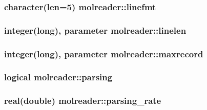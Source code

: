 \hypertarget{classmolreader_ac14650c697f68fd15530b93807e3f42f}{
\subsubsection[{linefmt}]{\setlength{\rightskip}{0pt plus 5cm}character(len=5) molreader\-::linefmt\hspace{0.3cm}{\ttfamily [private]}}}\label{classmolreader_ac14650c697f68fd15530b93807e3f42f}
\hypertarget{classmolreader_acd493d996a1fcd0ed77937e925c9b7fe}{
\subsubsection[{linelen}]{\setlength{\rightskip}{0pt plus 5cm}integer(long), parameter molreader\-::linelen\hspace{0.3cm}{\ttfamily [private]}}}\label{classmolreader_acd493d996a1fcd0ed77937e925c9b7fe}
\hypertarget{classmolreader_a7192fdfba4bcb0ee7504a9c6695c7106}{
\subsubsection[{maxrecord}]{\setlength{\rightskip}{0pt plus 5cm}integer(long), parameter molreader\-::maxrecord\hspace{0.3cm}{\ttfamily [private]}}}\label{classmolreader_a7192fdfba4bcb0ee7504a9c6695c7106}
\hypertarget{classmolreader_a151a8b8c33b86ab86d352aeaaf9ec84b}{
\subsubsection[{parsing}]{\setlength{\rightskip}{0pt plus 5cm}logical molreader\-::parsing\hspace{0.3cm}{\ttfamily [private]}}}\label{classmolreader_a151a8b8c33b86ab86d352aeaaf9ec84b}
\hypertarget{classmolreader_a5cf7dc5ccdeb068704a693ec6b248796}{
\subsubsection[{parsing\-\_\-rate}]{\setlength{\rightskip}{0pt plus 5cm}real(double) molreader\-::parsing\-\_\-rate\hspace{0.3cm}{\ttfamily [private]}}}\label{classmolreader_a5cf7dc5ccdeb068704a693ec6b248796}
